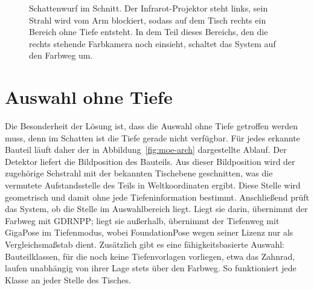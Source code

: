 \documentclass[oneside,studentpaper]{wbk}
\begin{document}
\begin{figure}[H]
\centering
{}
\caption{Schattenwurf im Schnitt. Der Infrarot-Projektor steht links, sein Strahl
wird vom Arm blockiert, sodass auf dem Tisch rechts ein Bereich ohne Tiefe
entsteht. In dem Teil dieses Bereichs, den die rechts stehende Farbkamera noch
einsieht, schaltet das System auf den Farbweg um.}
\label{fig:shadow}
\end{figure}

\section{Auswahl ohne Tiefe}
\label{sec:routing}

Die Besonderheit der Lösung ist, dass die Auswahl ohne Tiefe getroffen werden
muss, denn im Schatten ist die Tiefe gerade nicht verfügbar. Für jedes erkannte
Bauteil läuft daher der in Abbildung~\ref{fig:moe-arch} dargestellte Ablauf. Der
Detektor liefert die Bildposition des Bauteils. Aus dieser Bildposition wird der
zugehörige Sehstrahl mit der bekannten Tischebene geschnitten, was die vermutete
Aufstandsstelle des Teils in Weltkoordinaten ergibt. Diese Stelle wird
geometrisch und damit ohne jede Tiefeninformation bestimmt. Anschließend prüft das
System, ob die Stelle im Auswahlbereich liegt. Liegt sie darin, übernimmt der
Farbweg mit GDRNPP; liegt sie außerhalb, übernimmt der Tiefenweg mit GigaPose im
Tiefenmodus, wobei FoundationPose wegen seiner Lizenz nur als Vergleichsmaßstab
dient. Zusätzlich gibt es eine fähigkeitsbasierte Auswahl: Bauteilklassen, für die
noch keine Tiefenvorlagen vorliegen, etwa das Zahnrad, laufen unabhängig von ihrer
Lage stets über den Farbweg. So funktioniert jede Klasse an jeder Stelle des
Tisches.
\end{document}
